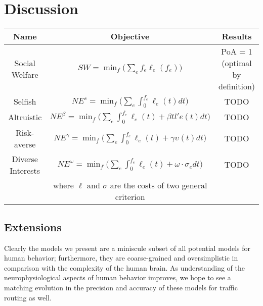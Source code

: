 \section{Discussion}\label{sec:discussion}

\begin{table}
\begin{center}
 \begin{tabular}{|c | c | c|} 
 \hline
 Name & Objective & Results \\
 \hline\hline
     Social Welfare & $SW = \min_f\Big(\sum_e f_e\ell_e(f_e)\Big)$ & PoA = 1 (optimal by definition) \\
 \hline
     Selfish & $NE^s = \min_f\Big(\sum_e\int_0^{f_e} \ell_e(t)dt\Big)$ & TODO\\
 \hline
     Altruistic & $NE^\beta = \min_f\Big(\sum_e\int_0^{f_e} \ell_e(t) + \beta tl'e(t)dt\Big)$ & TODO\\
\hline
     Risk-averse & $NE^\gamma = \min_f\Big(\sum_e\int_0^{f_e} \ell_e(t) + \gamma\upsilon(t)dt\Big)$ & TODO\\
\hline
     Diverse Interests & $NE^\omega = \min_f\Big(\sum_e\int_0^{f_e} \ell_e(t) + \omega\cdot \sigma_e dt\Big)$ & TODO\\
     & where $\ell$ and $\sigma$ are the costs of two general criterion &\\
\hline
\end{tabular}
\end{center}
\end{table}

\subsection{Extensions}
Clearly the models we present are a miniscule subset of all potential models for human behavior; 
furthermore, they are coarse-grained and oversimplistic in comparison with the complexity of the human
brain. As understanding of the neurophysiological aspects of human behavior improves, we hope to see a matching evolution in the precision and accuracy of these models for traffic routing as well.
